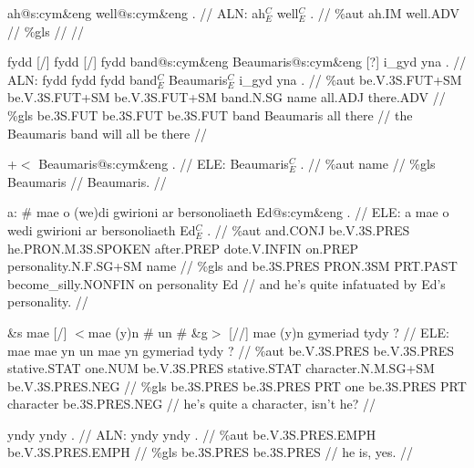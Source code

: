 \documentclass[a4paper,10pt]{article}
\begin{document}
\ex
\begingl[lingstyle=gergl]
\glchat ah@s:cym\&eng well@s:cym\&eng . //
\glsurface ALN:  ah$^{C}_{E}$ well$^{C}_{E}$ .  //
\glauto \%aut  ah{\scriptsize .IM} well{\scriptsize .ADV}   //
\glmanual \%gls      //
\gleng  //
\endgl
\xe

\ex
\begingl[lingstyle=gergl]
\glchat fydd [/] fydd [/] fydd band@s:cym\&eng Beaumaris@s:cym\&eng [?] i\_gyd yna . //
\glsurface ALN:  fydd fydd fydd band$^{C}_{E}$ Beaumaris$^{C}_{E}$ i\_gyd yna .  //
\glauto \%aut  be{\scriptsize .V.3S.FUT+SM} be{\scriptsize .V.3S.FUT+SM} be{\scriptsize .V.3S.FUT+SM} band{\scriptsize .N.SG} name all{\scriptsize .ADJ} there{\scriptsize .ADV}   //
\glmanual \%gls  be{\scriptsize .3S.FUT} be{\scriptsize .3S.FUT} be{\scriptsize .3S.FUT} band Beaumaris all there   //
\gleng the Beaumaris band will all be there //
\endgl
\xe

\ex
\begingl[lingstyle=gergl]
\glchat +$<$ Beaumaris@s:cym\&eng . //
\glsurface ELE:  Beaumaris$^{C}_{E}$ .  //
\glauto \%aut  name   //
\glmanual \%gls  Beaumaris   //
\gleng Beaumaris. //
\endgl
\xe

\ex
\begingl[lingstyle=gergl]
\glchat a: \# mae o (we)di gwirioni ar bersonoliaeth Ed@s:cym\&eng . //
\glsurface ELE:  a mae o wedi gwirioni ar bersonoliaeth Ed$^{C}_{E}$ .  //
\glauto \%aut  and{\scriptsize .CONJ} be{\scriptsize .V.3S.PRES} he{\scriptsize .PRON.M.3S.SPOKEN} after{\scriptsize .PREP} dote{\scriptsize .V.INFIN} on{\scriptsize .PREP} personality{\scriptsize .N.F.SG+SM} name   //
\glmanual \%gls  and be{\scriptsize .3S.PRES} PRON{\scriptsize .3SM} PRT{\scriptsize .PAST} become\_silly{\scriptsize .NONFIN} on personality Ed   //
\gleng and he's quite infatuated by Ed's personality. //
\endgl
\xe

\ex
\begingl[lingstyle=gergl]
\glchat \&s mae [/] $<$mae (y)n \# un \# \&g$>$ [//] mae (y)n gymeriad tydy ? //
\glsurface ELE:  mae mae yn un mae yn gymeriad tydy ?  //
\glauto \%aut  be{\scriptsize .V.3S.PRES} be{\scriptsize .V.3S.PRES} stative{\scriptsize .STAT} one{\scriptsize .NUM} be{\scriptsize .V.3S.PRES} stative{\scriptsize .STAT} character{\scriptsize .N.M.SG+SM} be{\scriptsize .V.3S.PRES.NEG}   //
\glmanual \%gls  be{\scriptsize .3S.PRES} be{\scriptsize .3S.PRES} PRT one be{\scriptsize .3S.PRES} PRT character be{\scriptsize .3S.PRES.NEG}   //
\gleng he's quite a character, isn't he? //
\endgl
\xe

\ex
\begingl[lingstyle=gergl]
\glchat yndy yndy . //
\glsurface ALN:  yndy yndy .  //
\glauto \%aut  be{\scriptsize .V.3S.PRES.EMPH} be{\scriptsize .V.3S.PRES.EMPH}   //
\glmanual \%gls  be{\scriptsize .3S.PRES} be{\scriptsize .3S.PRES}   //
\gleng he is, yes. //
\endgl
\xe
\end{document}
